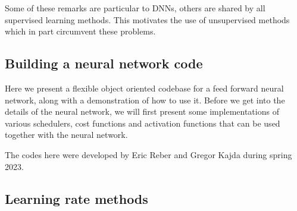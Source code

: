 \documentclass[%
oneside,                 %
final,                   %
10pt]{article}
\begin{document}
\noindent
Some of these remarks are particular to DNNs, others are shared by all supervised learning methods. This motivates the use of unsupervised methods which in part circumvent these problems.

\subsection{Building a neural network code}

Here we  present a flexible object oriented codebase
for a feed forward neural network, along with a demonstration of how
to use it. Before we get into the details of the neural network, we
will first present some implementations of various schedulers, cost
functions and activation functions that can be used together with the
neural network.

The codes here were developed by Eric Reber and Gregor Kajda during spring 2023.

\subsection{Learning rate methods}
\end{document}
